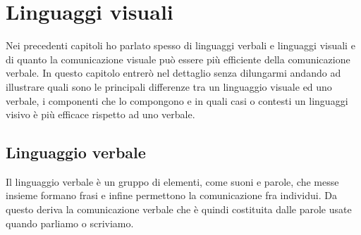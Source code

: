 \chapter{Linguaggi visuali}

    Nei precedenti capitoli ho parlato spesso di linguaggi verbali e linguaggi visuali e di quanto la comunicazione visuale può essere più efficiente della comunicazione verbale. In questo capitolo entrerò nel dettaglio senza dilungarmi andando ad illustrare quali sono le principali differenze tra un linguaggio visuale ed uno verbale, i componenti che lo compongono e in quali casi o contesti un linguaggi visivo è più efficace rispetto ad uno verbale.

    \section{Linguaggio verbale}
        Il linguaggio verbale è un gruppo di elementi, come suoni e parole, che messe insieme formano frasi e infine permettono la comunicazione fra individui. Da questo deriva la comunicazione verbale che è quindi costituita dalle parole usate quando parliamo o scriviamo.

